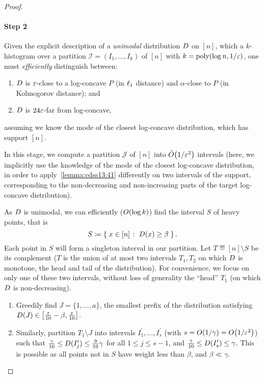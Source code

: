 \begin{proof}
\paragraph{Step 2}\label{stage:2}
Given the explicit description of a \emph{unimodal} distribution $\D$ on $[n]$, which a $k$-histogram over a partition $\mathcal{I}=(I_1,\dots, I_k)$ of $[n]$ with $k=\poly(\log n, 1/\eps)$, one must \emph{efficiently} distinguish between:
  \begin{enumerate}[\sf(a)]
    \item $\D$ is $\eps$-close to a log-concave $P$ (in $\lp[1]$ distance) and $\alpha$-close to $P$ (in Kolmogorov distance); and
    \item $\D$ is $24\eps$-far from log-concave,
  \end{enumerate} 
  assuming we know the mode of the closest log-concave distribution, which has support $[n]$.

In this stage, we compute a partition $\mathcal{J}$ of $[n]$ into $\tildeO{1/\eps^2}$ intervals (here, we implicitly use the knowledge of the mode of the closest log-concave distribution, in order to apply~\cref{lemma:cdss13:41} differently on two intervals of the support, corresponding to the non-decreasing and non-increasing parts of the target log-concave distribution).

As $\D$ is unimodal, we can efficiently ($\bigO{\log k}$) find the interval $S$ of heavy points, that is 
\[
  S\eqdef \setOfSuchThat{ x \in [n] }{  \D(x) \geq \beta }.
\]
Each point in $S$ will form a singleton interval in our partition. 
Let $T\eqdef [n]\setminus S$ be its complement ($T$ is the union of at most two intervals $T_1,T_2$ on which $\D$ is monotone, the head and tail of the distribution). For convenience, we focus on only one of these two intervals, without loss of generality the ``head'' $T_1$ (on which $\D$ is non-decreasing).

\begin{enumerate}
  \item Greedily find $J=\{1,\dots,a\}$, the smallest prefix of the distribution satisfying $\D(J)\in\left[\frac{\eps}{10}-\beta, \frac{\eps}{10}\right]$.
  \item Similarly, partition $T_1\setminus J$ into intervals $I^\prime_1,\dots,I^\prime_s$ (with $s=\bigO{1/\gamma}=\bigO{1/\eps^2}$) such that
    $
      \frac{\gamma}{10} \leq \D(I^\prime_j) \leq \frac{9}{10}\gamma
    $
    for all $1\leq j \leq s-1$, and $\frac{\gamma}{10} \leq \D(I^\prime_s) \leq \gamma$. This is possible as all points not in $S$ have weight less than $\beta$, and $\beta \ll \gamma$.
\end{enumerate}


\end{proof}
